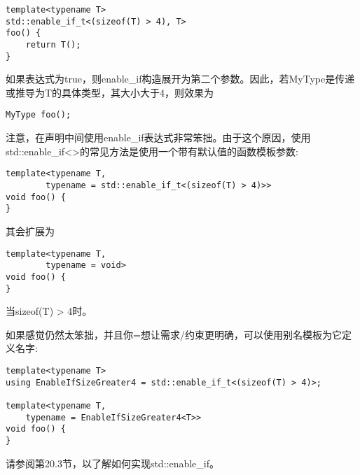\begin{lstlisting}[style=styleCXX]
template<typename T>
std::enable_if_t<(sizeof(T) > 4), T>
foo() {
	return T();
}
\end{lstlisting}

如果表达式为true，则enable\_if构造展开为第二个参数。因此，若MyType是传递或推导为T的具体类型，其大小大于4，则效果为

\begin{lstlisting}[style=styleCXX]
MyType foo();
\end{lstlisting}

注意，在声明中间使用enable\_if表达式非常笨拙。由于这个原因，使用std::enable\_if<>的常见方法是使用一个带有默认值的函数模板参数: 

\begin{lstlisting}[style=styleCXX]
template<typename T,
		typename = std::enable_if_t<(sizeof(T) > 4)>>
void foo() {
}
\end{lstlisting}

其会扩展为

\begin{lstlisting}[style=styleCXX]
template<typename T,
		typename = void>
void foo() {
}
\end{lstlisting}

当sizeof(T) > 4时。

如果感觉仍然太笨拙，并且你=想让需求/约束更明确，可以使用别名模板为它定义名字:

\begin{lstlisting}[style=styleCXX]
template<typename T>
using EnableIfSizeGreater4 = std::enable_if_t<(sizeof(T) > 4)>;

template<typename T,
	typename = EnableIfSizeGreater4<T>>
void foo() {
}
\end{lstlisting}

请参阅第20.3节，以了解如何实现std::enable\_if。










